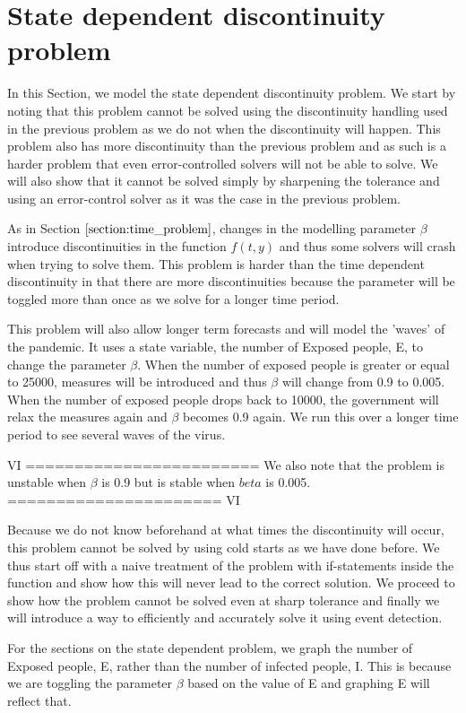 
\section{State dependent discontinuity problem}
In this Section, we model the state dependent discontinuity problem. We start by noting that this problem cannot be solved using the discontinuity handling used in the previous problem as we do not when the discontinuity will happen. This problem also has more discontinuity than the previous problem and as such is a harder problem that even error-controlled solvers will not be able to solve. We will also show that it cannot be solved simply by sharpening the tolerance and using an error-control solver as it was the case in the previous problem.
 
As in Section $\ref{section:time_problem}$, changes in the modelling parameter $\beta$ introduce discontinuities in the function $f(t, y)$ and thus some solvers will crash when trying to solve them. This problem is harder than the time dependent discontinuity in that there are more discontinuities because the parameter will be toggled more than once as we solve for a longer time period.

This problem will also allow longer term forecasts and will model the 'waves' of the pandemic. It uses a state variable, the number of Exposed people, E, to change the parameter $\beta$. When the number of exposed people is greater or equal to 25000,  measures will be introduced and thus $\beta$ will change from 0.9 to 0.005. When the number of exposed people drops back to 10000, the government will relax the measures again and $\beta$ becomes 0.9 again. We run this over a longer time period to see several waves of the virus.

VI ========================
We also note that the problem is unstable when $\beta$ is 0.9 but is stable when $beta$ is 0.005.
====================== VI

Because we do not know beforehand at what times the discontinuity will occur, this problem cannot be solved by using cold starts as we have done before. We thus start off with a naive treatment of the problem with if-statements inside the function and show how this will never lead to the correct solution. We proceed to show how the problem cannot be solved even at sharp tolerance and finally we will introduce a way to efficiently and accurately solve it using event detection.

For the sections on the state dependent problem, we graph the number of Exposed people, E, rather than the number of infected people, I. This is because we are toggling the parameter $\beta$ based on the value of E and graphing E will reflect that.

